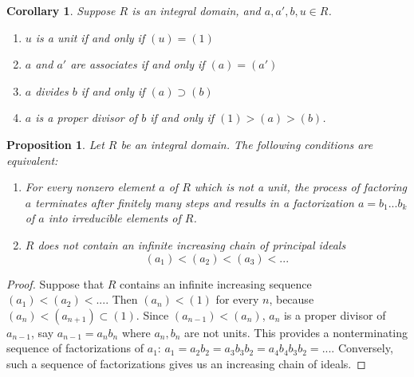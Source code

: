 \documentclass[12pt]{article}
\newtheorem{cor}[thm]{Corollary}
\newtheorem{prop}[thm]{Proposition}
\theoremstyle{definition}
\theoremstyle{remark}
\numberwithin{equation}{section}
\begin{document}
\vspace{15pt}


\begin{cor}
        Suppose $R$ is an integral domain, and $a,a',b,u \in R$. \begin{enumerate}
                \item $u$ is a unit if and only if $(u) = (1)$
                \item $a$ and $a'$ are associates if and only if $(a) = (a')$
                \item $a$ divides $b$ if and only if $(a) \supset (b)$
                \item $a$ is a proper divisor of $b$ if and only if $(1) > (a) > (b)$.
        \end{enumerate}
\end{cor}

\vspace{15pt}

\begin{prop}
        Let $R$ be an integral domain. The following conditions are equivalent: \begin{enumerate}
                \item For every nonzero element $a$ of $R$ which is not a unit, the process of factoring $a$ terminates after finitely many steps and results in a factorization $a = b_1...b_k$ of $a$ into irreducible elements of $R$.
                \item $R$ does not contain an infinite increasing chain of principal ideals \begin{equation}
                                (a_1) < (a_2) < (a_3) < ...
                \end{equation}
        \end{enumerate}
\end{prop}
\begin{proof}
        Suppose that $R$ contains an infinite increasing sequence $(a_1) < (a_2) < ...$. Then $(a_n) < (1)$ for every $n$, because $(a_n) < (a_{n+1}) \subset (1)$. Since $(a_{n-1}) < (a_n)$, $a_n$ is a proper divisor of $a_{n-1}$, say $a_{n-1} = a_nb_n$ where $a_n,b_n$ are not units. This provides a nonterminating sequence of factorizations of $a_1$: $a_1 = a_2b_2 = a_3b_3b_2 = a_4b_4b_3b_2=...$. Conversely, such a sequence of factorizations gives us an increasing chain of ideals.
\end{proof}

\vspace{15pt}
\end{document}
